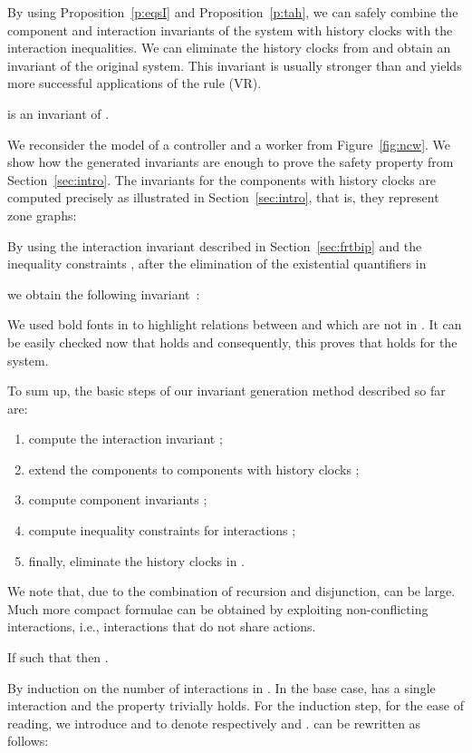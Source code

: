 \documentclass{LMCS}
\theoremstyle{plain}\newtheorem{remark}[thm]{Remark}
\theoremstyle{plain}\newtheorem{example}[thm]{Example}
\begin{document}
By using Proposition~\ref{p:eqsI} and Proposition~\ref{p:tah}, we can
safely combine the component and interaction invariants of the system with
history clocks with the interaction inequalities.  We can eliminate the
history clocks from  and obtain an invariant of the original system. This
invariant is usually stronger than  and yields more successful applications of the rule (VR).

\begin{cor}
   is an invariant of .
\end{cor}

\begin{exa} 
\label{eg:hc}
We reconsider the model of a controller and a worker from
Figure~\ref{fig:ncw}. We show how the generated invariants are enough
to prove the safety property  from Section~\ref{sec:intro}. The
invariants for the components with history clocks are computed
precisely as illustrated in Section~\ref{sec:intro}, that is, they
represent zone graphs:


By using the interaction invariant described in Section~\ref{sec:frtbip}
 and the inequality constraints ,
 after the elimination of the existential quantifiers in 

we obtain the following invariant \,:


We used bold fonts in  to highlight relations between  and
 which are not in . It can be easily checked now that  holds and consequently, this proves that
 holds for the system.
\end{exa}
\noindent To sum up, the basic steps of our invariant generation method described so far are: 
\begin{enumerate}
\item compute the interaction invariant ;
\item extend the components  to components with history clocks
  ;
\item compute component invariants ;
\item compute inequality constraints  for interactions
  ;
\item finally, eliminate the history clocks in .
\end{enumerate}
We note that, due to the combination of recursion and disjunction,
 can be large. Much more compact formulae can be
obtained by exploiting non-conflicting interactions, i.e.,
interactions that do not share actions.
\begin{prop}
 \label{p:eqsDisj}
 If  such that  then .
\end{prop}
\proof By induction on the number of interactions in . In the
base case,  has a single interaction and the property trivially
holds.  For the induction step, for the ease of reading, we introduce
 and  to denote respectively
 and
.  can be rewritten as follows:
\end{document}
